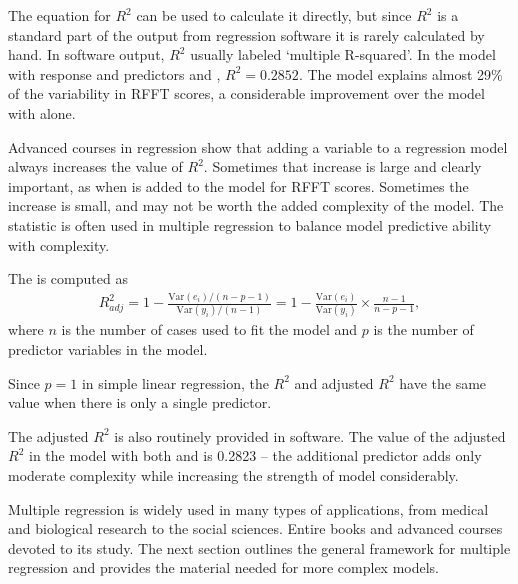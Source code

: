 The equation for $R^2$ can be used to calculate it directly, but since $R^2$ is a standard part of the output from regression software it is rarely calculated by hand. In software output, $R^2$ usually labeled `multiple R-squared'. In the  model with response  and predictors  and  , $R^2 = 0.2852$.  The model explains almost 29\% of the variability in RFFT scores, a considerable improvement over the model with  alone.

Advanced courses in regression show that adding a variable to a regression model always increases the value of $R^2$.  Sometimes that increase is large and clearly important, as when  is added to the model for RFFT scores.  Sometimes the increase is small, and may not be worth the added complexity of the model.  The statistic  is often used in multiple regression to balance model predictive ability with complexity.

\begin{termBox}{
The  is computed as
\begin{align*}
R_{adj}^{2} = 1-\frac{\text{Var}(e_i) / (n-p-1)}{\text{Var}(y_i) / (n-1)}
	= 1-\frac{\text{Var}(e_i)}{\text{Var}(y_i)} \times
    \frac{n-1}{n-p-1},
\end{align*}
where $n$ is the number of cases used to fit the model and $p$ is the number of predictor variables in the model.}
\end{termBox}

Since $p = 1$ in simple linear regression, the $R^2$ and adjusted $R^2$ have the same value when there is only a single predictor.

The adjusted $R^2$ is also routinely provided in software.  The value of the adjusted $R^2$ in the model with both  and  is 0.2823 -- the additional predictor  adds only moderate complexity while increasing the strength of model considerably.


Multiple regression is widely used in many types of applications, from medical and biological research to the social sciences. Entire books and advanced courses devoted to its study.  The next section outlines the general framework for multiple regression and provides the material needed for more complex models.
 
